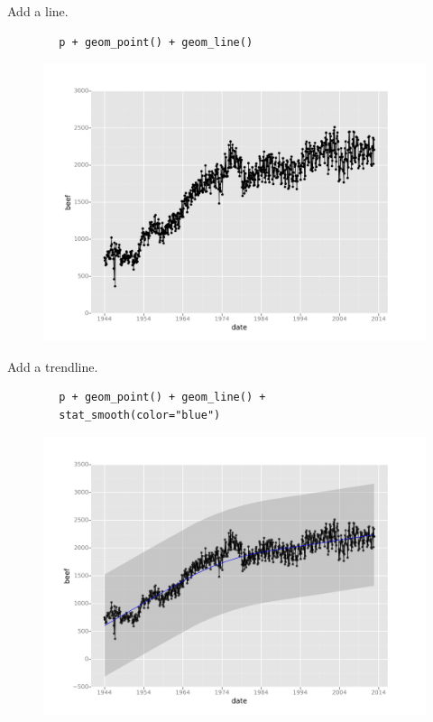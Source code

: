 \documentclass{beamer}
\begin{document}
\begin{frame}[fragile]
	Add a line.
	\begin{framed}
		\begin{verbatim}
		p + geom_point() + geom_line()
		\end{verbatim}
	\end{framed}
	\begin{figure}
		\centering
		\includegraphics[width=0.7\linewidth]{Layers3}
	\end{figure}
	
	
\end{frame}





\begin{frame}[fragile]
	Add a trendline.
	\begin{framed}
		\begin{verbatim}
		p + geom_point() + geom_line() +
		stat_smooth(color="blue")
		\end{verbatim}
	\end{framed}
	\begin{figure}
		\centering
		\includegraphics[width=0.7\linewidth]{layers4}
	\end{figure}
\end{frame}
\end{document}
